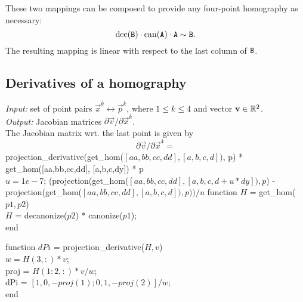 These two mappings can be composed to provide any four-point homography as necessary:
$$\mathrm{dec}(\mathtt{B}) \cdot \mathrm{can}(\mathtt{A}) \cdot \mathtt{A} \sim \mathtt{B}.$$
The resulting mapping is linear with respect to the last column of $\mathtt{B}$.


\subsection{Derivatives of a homography}
\label{s.homderivatives}

\textit{Input:} set of point pairs $\vec x^k \leftrightarrow \vec p^k$, where $1 \leq k \leq 4$ and vector $\mathbf{v} \in \mathbb{R}^2$.\\
\textit{Output:} Jacobian matrices $\partial \vec v / \partial \vec x^k$.\\

The Jacobian matrix wrt. the last point is given by
\begin{equation}
\partial \vec v / \partial \vec x^4 = 
\end{equation}
projection\_derivative(get\_hom($[aa,bb,cc,dd], [a,b,c,d])$, p) * get\_hom([aa,bb,cc,dd], [a,b,c,dy]) * p\\
$u=1e-7$; (projection(get\_hom($[aa,bb,cc,dd], [a,b,c,d+u*dy]), p$) - projection(get\_hom($[aa,bb,cc,dd], [a,b,c,d]), p)) / u$
function $H$ = get\_hom($p1,p2$)\\
 $H$ = decanonize($p2$) * canonize($p1$);\\
end

function $dPi$ = projection\_derivative($H, v$)\\
 $w = H(3,:) * v$;\\
 proj = $H(1:2,:) * v / w$;\\
 dPi = $[1, 0, -proj(1); 0, 1, -proj(2)] / w$;\\
end


